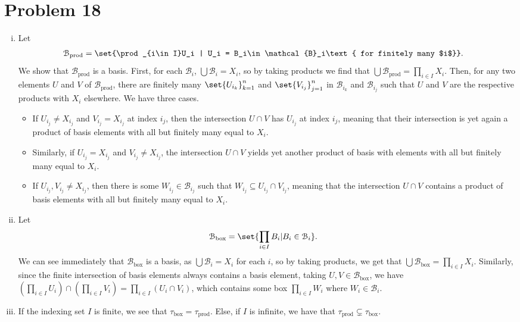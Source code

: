 \documentclass[10pt]{mypackage}
\begin{document}
\section{Problem 18}%
\begin{enumerate}[(i)]
  \item Let 
    \begin{align*}
      \mathcal{B}_{\text{prod}} &= \set{\prod_{i\in I}U_i | U_i = B_i\in \mathcal{B}_i\text{ for finitely many $i$}}.
    \end{align*}
    We show that $\mathcal{B}_{\text{prod}}$ is a basis. First, for each $\mathcal{B}_i$, $\bigcup \mathcal{B}_i = X_i$, so by taking products we find that $\bigcup \mathcal{B}_{\text{prod}} = \prod_{i\in I}X_i$. Then, for any two elements $U$ and $V$ of $\mathcal{B}_{\text{prod}}$, there are finitely many $\set{U_{i_k}}_{k=1}^{n}$ and $\set{V_{i_j}}_{j=1}^{n}$ in $\mathcal{B}_{i_k}$ and $\mathcal{B}_{i_j}$ such that $U$ and $V$ are the respective products with $X_i$ elsewhere. We have three cases.
    \begin{itemize}
      \item If $U_{i_j}\neq X_{i_j}$ and $V_{i_j} = X_{i_j}$ at index $i_j$, then the intersection $U\cap V$ has $U_{i_j}$ at index $i_j$, meaning that their intersection is yet again a product of basis elements with all but finitely many equal to $X_i$.
      \item Similarly, if $U_{i_j} = X_{i_j}$ and $V_{i_j}\neq X_{i_j}$, the intersection $U\cap V$ yields yet another product of basis with elements with all but finitely many equal to $X_i$.
      \item If $U_{i_j},V_{i_j}\neq X_{i_j}$, then there is some $W_{i_j}\in \mathcal{B}_{i_j}$ such that $W_{i_j}\subseteq U_{i_j}\cap V_{i_j}$, meaning that the intersection $U\cap V$ contains a product of basis elements with all but finitely many equal to $X_i$.
    \end{itemize}
  \item Let
    \begin{align*}
      \mathcal{B}_{\text{box}} &= \set{\prod_{i\in I} B_i | B_i\in \mathcal{B}_i}.
    \end{align*}
    We can see immediately that $\mathcal{B}_{\text{box}}$ is a basis, as $\bigcup \mathcal{B}_i = X_i$ for each $i$, so by taking products, we get that $\bigcup \mathcal{B}_{\text{box}} = \prod_{i\in I}X_i$. Similarly, since the finite intersection of basis elements always contains a basis element, taking $U,V\in \mathcal{B}_{\text{box}}$, we have $\left( \prod_{i\in I}U_i \right)\cap \left( \prod_{i\in I}V_i \right) = \prod_{i\in I}\left( U_i\cap V_i \right)$, which contains some box $\prod_{i\in I} W_i$ where $W_i\in \mathcal{B}_i$.
  \item If the indexing set $I$ is finite, we see that $\tau_{\text{box}} = \tau_{\text{prod}}$. Else, if $I$ is infinite, we have that $\tau_{\text{prod}}\subsetneq \tau_{\text{box}}$.
\end{enumerate}
\end{document}
